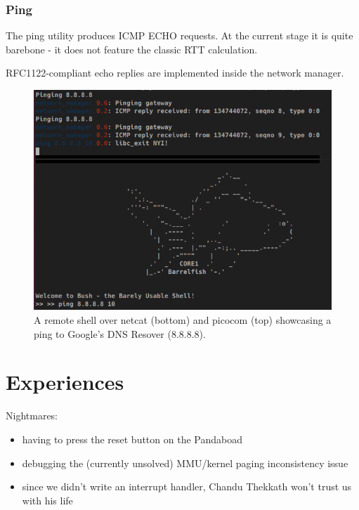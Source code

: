 \documentclass[a4paper,twoside,openright]{report}
\begin{document}
\subsection{Ping}
The ping utility produces ICMP ECHO requests. At the current stage it is quite barebone - it does not feature the classic RTT calculation.

RFC1122-compliant echo replies are implemented inside the network manager.

\begin{figure}
	\centering
	\includegraphics[width=0.7\linewidth]{assets/net_term_ping}
	\caption{A remote shell over netcat (bottom) and picocom (top) showcasing a ping to Google's DNS Resover (8.8.8.8).}
	\label{fig:nettermping}
\end{figure}




\appendix 
{}


\chapter{Experiences}
Nightmares:
\begin{itemize}
	\item having to press the reset button on the Pandaboad
	\item debugging the (currently unsolved) MMU/kernel paging inconsistency issue
	\item since we didn't write an interrupt handler, Chandu Thekkath won't trust us with his life
\end{itemize}
\end{document}
